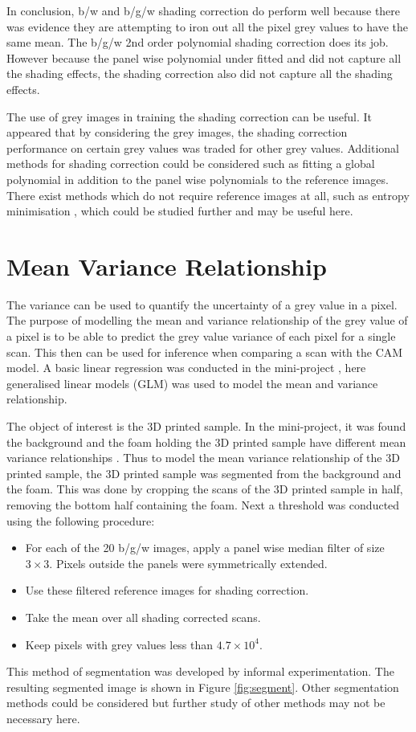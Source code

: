 \documentclass[a4paper]{proc}
\begin{document}
In conclusion, b/w and b/g/w shading correction do perform well because there was evidence they are attempting to iron out all the pixel grey values to have the same mean. The b/g/w 2nd order polynomial shading correction does its job. However because the panel wise polynomial under fitted and did not capture all the shading effects, the shading correction also did not capture all the shading effects.

The use of grey images in training the shading correction can be useful. It appeared that by considering the grey images, the shading correction performance on certain grey values was traded for other grey values. Additional methods for shading correction could be considered such as fitting a global polynomial in addition to the panel wise polynomials to the reference images. There exist methods which do not require reference images at all, such as entropy minimisation \cite{likar2000retrospective}, which could be studied further and may be useful here.

\section{Mean Variance Relationship}
The variance can be used to quantify the uncertainty of a grey value in a pixel. The purpose of modelling the mean and variance relationship of the grey value of a pixel is to be able to predict the grey value variance of each pixel for a single scan. This then can be used for inference when comparing a scan with the CAM model. A basic linear regression was conducted in the mini-project \cite{ip2016inside}, here generalised linear models (GLM) \cite{nelder1972generalized} \cite{mccullagh1984generalized} was used to model the mean and variance relationship.

The object of interest is the 3D printed sample. In the mini-project, it was found the background and the foam holding the 3D printed sample have different mean variance relationships \cite{ip2016inside}. Thus to model the mean variance relationship of the 3D printed sample, the 3D printed sample was segmented from the background and the foam. This was done by cropping the scans of the 3D printed sample in half, removing the bottom half containing the foam. Next a threshold was conducted using the following procedure: 
\begin{itemize}
	\item For each of the 20 b/g/w images, apply a panel wise median filter of size $3\times3$. Pixels outside the panels were symmetrically extended.
	\item Use these filtered reference images for shading correction.
	\item Take the mean over all shading corrected scans.
	\item Keep pixels with grey values less than $4.7\times 10^4$.
\end{itemize}
This method of segmentation was developed by informal experimentation. The resulting segmented image is shown in Figure \ref{fig:segment}. Other segmentation methods could be considered but further study of other methods may not be necessary here.
\end{document}
